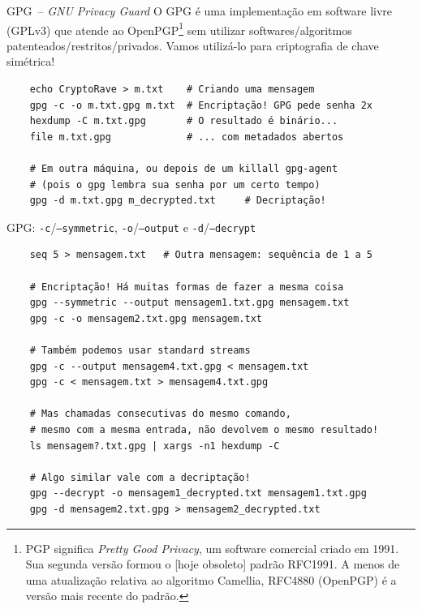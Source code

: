 \documentclass[utf8]{beamer}
\begin{document}
\begin{frame}[fragile]{GPG~-- \emph{GNU Privacy Guard}}
  O GPG é uma implementação em software livre (GPLv3)
  que atende ao OpenPGP\footnote{
      PGP significa \emph{Pretty Good Privacy},
      um software comercial criado em 1991.
      Sua segunda versão formou o [hoje obsoleto] padrão RFC1991.
      A menos de uma atualização relativa ao algoritmo Camellia,
      RFC4880 (OpenPGP) é a versão mais recente do padrão.
    }
  sem utilizar softwares/algoritmos patenteados/restritos/privados.
  \vfill
  Vamos utilizá-lo para criptografia de chave simétrica!
  \vfill
  \begin{verbatim}
    echo CryptoRave > m.txt    # Criando uma mensagem
    gpg -c -o m.txt.gpg m.txt  # Encriptação! GPG pede senha 2x
    hexdump -C m.txt.gpg       # O resultado é binário...
    file m.txt.gpg             # ... com metadados abertos

    # Em outra máquina, ou depois de um killall gpg-agent
    # (pois o gpg lembra sua senha por um certo tempo)
    gpg -d m.txt.gpg m_decrypted.txt     # Decriptação!
  \end{verbatim}
\end{frame}


\begin{frame}[fragile]{GPG: \texttt{-c}/\texttt{--symmetric},
                            \texttt{-o}/\texttt{--output} e
                            \texttt{-d}/\texttt{--decrypt}}
  \begin{verbatim}
    seq 5 > mensagem.txt   # Outra mensagem: sequência de 1 a 5

    # Encriptação! Há muitas formas de fazer a mesma coisa
    gpg --symmetric --output mensagem1.txt.gpg mensagem.txt
    gpg -c -o mensagem2.txt.gpg mensagem.txt

    # Também podemos usar standard streams
    gpg -c --output mensagem4.txt.gpg < mensagem.txt
    gpg -c < mensagem.txt > mensagem4.txt.gpg

    # Mas chamadas consecutivas do mesmo comando,
    # mesmo com a mesma entrada, não devolvem o mesmo resultado!
    ls mensagem?.txt.gpg | xargs -n1 hexdump -C

    # Algo similar vale com a decriptação!
    gpg --decrypt -o mensagem1_decrypted.txt mensagem1.txt.gpg
    gpg -d mensagem2.txt.gpg > mensagem2_decrypted.txt
  \end{verbatim}
\end{frame}
\end{document}
